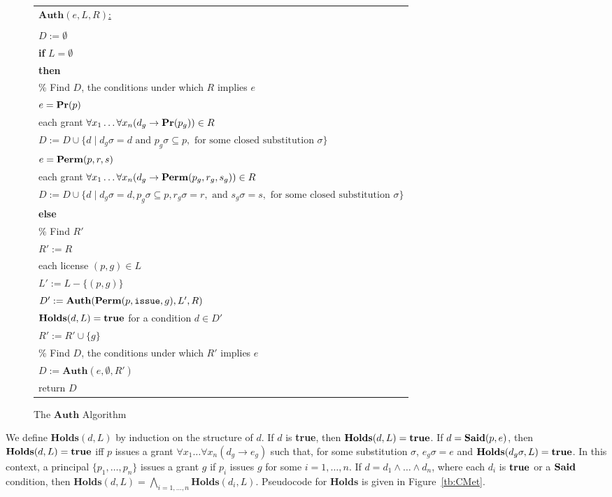 \documentclass{acmtrans2m}
\newcommand{\<}{
}
\renewcommand{\>}{\rangle}
\newcommand{\union}{\cup}
\newcommand{\Said}{\mathit{\bf Said}}
\newcommand{\true}{\mathit{\bf{true}}}
\newcommand{\Permitted}{\mathit{\bf Perm}}
\renewcommand{\Pr}{\mathit{\bf Pr}}
\newcommand{\vtab}{\phantom{Le}}
\newcommand{\cd}{d}
\newcommand{\cc}{e}
\newcommand{\issue}{\mathtt{issue}}
\newcommand{\imp}{\rightarrow}
\newcommand{\XA}{\textbf{Auth}}
\newcommand{\CMet}{\textbf{Holds}}
\begin{document}
\begin{figure*}[htb]
\begin{center}
\begin{tabular}{|l|}\hline
\underline{$\XA(\cc, L, R)$:}\\\\
$D := \emptyset$\\
{\bf if} $L = \emptyset$\\
{\bf then} \\
\vtab\% Find $D$, the conditions under which $R$ implies $e$\\
\vtab{\bf if} $\cc = \Pr(p)$\\
\vtab\vtab{\bf for} each grant $\forall x_1 \ldots \forall x_n(\cd_g\imp\Pr(p_g)) \in R$\\
\vtab\vtab\vtab $D := D \union \{\cd\mid\cd_g\sigma = \cd\mbox{ and }p_g\sigma\subseteq p,
\mbox{ for some closed substitution }\sigma\}$\\
\vtab{\bf if} $\cc = \Permitted(p, r, s)$\\
\vtab\vtab{\bf for} each grant $\forall x_1 \ldots \forall x_n(\cd_g\imp\Permitted(p_g, r_g, s_g)) \in R$\\
\vtab\vtab\vtab $D := D \union \{\cd\mid\cd_g\sigma = \cd, p_g\sigma\subseteq p, r_g\sigma = r,
\mbox{ and }s_g\sigma = s, \mbox{ for some closed substitution }\sigma\}$\\
{\bf else} \\
\vtab\% Find $R'$\\
\vtab $R' := R$\\
\vtab {\bf for} each license $(p, g) \in L$\\
\vtab\vtab $L' := L - \{(p, g)\}$\\
\vtab\vtab $D' := \XA(\Permitted(p, \issue, g), L', R)$\\
\vtab\vtab {\bf if} $\CMet(\cd, L) = \true$ for a condition $\cd\in D'$\\
\vtab\vtab {\bf then} $R' := R'\union \{g\}$\\
\vtab\% Find $D$, the conditions under which $R'$ implies $\cc$\\
\vtab $D := \XA(\cc, \emptyset, R')$\\
return $D$\\
\hline
\end{tabular}
\end{center}
\caption{The $\XA$ Algorithm}
\label{tb:auth}
\end{figure*}

We define $\CMet(\cd, L)$ by induction on the structure of $\cd$.  If $\cd$ is {\bf true},
then $\CMet(\cd, L) = \true$.  If $\cd = \Said(p, \cc)$, then $\CMet(d, L) = \true$ iff
$p$ issues a grant $\forall x_1 \ldots\forall x_n (\cd_g\imp\cc_g)$ such that, for some
substitution $\sigma$, $e_g\sigma = e$ and $\CMet(\cd_g\sigma, L) = \true$.  In this context,
a principal $\{p_1, \ldots, p_n\}$ issues a grant $g$ if $p_i$ issues $g$ for some
$i = 1, \ldots, n$.  If $\cd = \cd_1\land\ldots\land\cd_n$, where each $\cd_i$ is $\true$ or
a $\Said$ condition, then $\CMet(\cd, L) = \bigwedge_{i = 1, \ldots, n}\CMet(\cd_i, L)$.
Pseudocode for $\CMet$ is given in Figure~\ref{tb:CMet}.
\end{document}
